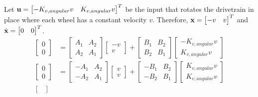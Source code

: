 Let $\mathbf{u} =
\begin{bmatrix}
  -K_{v,angular} v & K_{v,angular} v
\end{bmatrix}^T$ be the input that rotates the drivetrain in place where each
wheel has a constant velocity $v$. Therefore, $\mathbf{x} =
\begin{bmatrix}
  -v & v
\end{bmatrix}^T$ and $\dot{\mathbf{x}} =
\begin{bmatrix}
  0 & 0
\end{bmatrix}^T$.
\begin{align*}
  \begin{bmatrix}
    0 \\
    0
  \end{bmatrix} &=
    \begin{bmatrix}
      A_1 & A_2 \\
      A_2 & A_1
    \end{bmatrix}
    \begin{bmatrix}
      -v \\
      v
    \end{bmatrix} +
    \begin{bmatrix}
      B_1 & B_2 \\
      B_2 & B_1
    \end{bmatrix}
    \begin{bmatrix}
      -K_{v,angular} v \\
      K_{v,angular} v
    \end{bmatrix} \\
  \begin{bmatrix}
    0 \\
    0
  \end{bmatrix} &=
    \begin{bmatrix}
      -A_1 & A_2 \\
      -A_2 & A_1
    \end{bmatrix}
    \begin{bmatrix}
      v \\
      v
    \end{bmatrix} +
    \begin{bmatrix}
      -B_1 & B_2 \\
      -B_2 & B_1
    \end{bmatrix}
    \begin{bmatrix}
      K_{v,angular} v \\
      K_{v,angular} v
    \end{bmatrix} \\
  \begin{bmatrix}

\end{bmatrix}
\end{align*}
